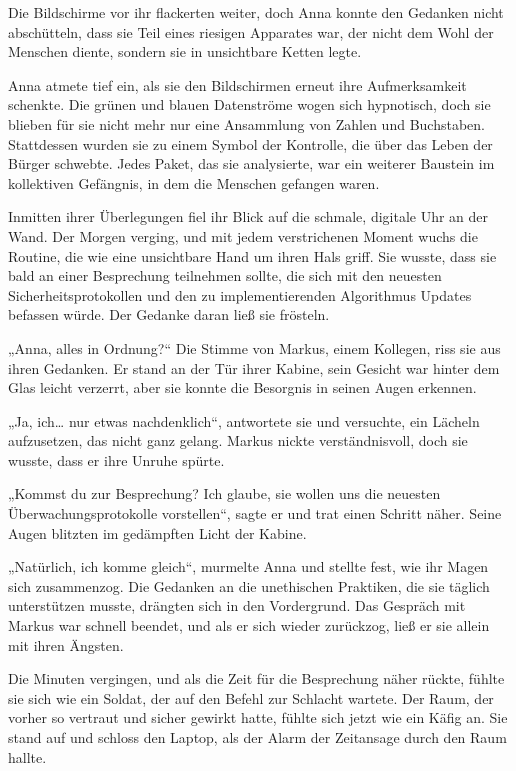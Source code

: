 \documentclass[
]{article}
\begin{document}
Die Bildschirme vor ihr flackerten weiter, doch Anna konnte den Gedanken
nicht abschütteln, dass sie Teil eines riesigen Apparates war, der nicht
dem Wohl der Menschen diente, sondern sie in unsichtbare Ketten legte.

Anna atmete tief ein, als sie den Bildschirmen erneut ihre
Aufmerksamkeit schenkte. Die grünen und blauen Datenströme wogen sich
hypnotisch, doch sie blieben für sie nicht mehr nur eine Ansammlung von
Zahlen und Buchstaben. Stattdessen wurden sie zu einem Symbol der
Kontrolle, die über das Leben der Bürger schwebte. Jedes Paket, das sie
analysierte, war ein weiterer Baustein im kollektiven Gefängnis, in dem
die Menschen gefangen waren.

Inmitten ihrer Überlegungen fiel ihr Blick auf die schmale, digitale Uhr
an der Wand. Der Morgen verging, und mit jedem verstrichenen Moment
wuchs die Routine, die wie eine unsichtbare Hand um ihren Hals griff.
Sie wusste, dass sie bald an einer Besprechung teilnehmen sollte, die
sich mit den neuesten Sicherheitsprotokollen und den zu
implementierenden Algorithmus Updates befassen würde. Der Gedanke daran
ließ sie frösteln.

„Anna, alles in Ordnung?{\kern0pt}`` Die Stimme von Markus, einem
Kollegen, riss sie aus ihren Gedanken. Er stand an der Tür ihrer Kabine,
sein Gesicht war hinter dem Glas leicht verzerrt, aber sie konnte die
Besorgnis in seinen Augen erkennen.

„Ja, ich\ldots{} nur etwas nachdenklich``, antwortete sie und versuchte,
ein Lächeln aufzusetzen, das nicht ganz gelang. Markus nickte
verständnisvoll, doch sie wusste, dass er ihre Unruhe spürte.

„Kommst du zur Besprechung? Ich glaube, sie wollen uns die neuesten
Überwachungsprotokolle vorstellen``, sagte er und trat einen Schritt
näher. Seine Augen blitzten im gedämpften Licht der Kabine.

„Natürlich, ich komme gleich``, murmelte Anna und stellte fest, wie ihr
Magen sich zusammenzog. Die Gedanken an die unethischen Praktiken, die
sie täglich unterstützen musste, drängten sich in den Vordergrund. Das
Gespräch mit Markus war schnell beendet, und als er sich wieder
zurückzog, ließ er sie allein mit ihren Ängsten.

Die Minuten vergingen, und als die Zeit für die Besprechung näher
rückte, fühlte sie sich wie ein Soldat, der auf den Befehl zur Schlacht
wartete. Der Raum, der vorher so vertraut und sicher gewirkt hatte,
fühlte sich jetzt wie ein Käfig an. Sie stand auf und schloss den
Laptop, als der Alarm der Zeitansage durch den Raum hallte.
\end{document}
